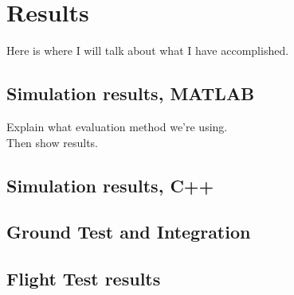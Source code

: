 \chapter{Results}\label{ch:results}

\par Here is where I will talk about what I have accomplished.
\section{Simulation results, MATLAB}
Explain what evaluation method we're using. \\
Then show results.
\section{Simulation results, C++}
\section{Ground Test and Integration}
\section{Flight Test results}